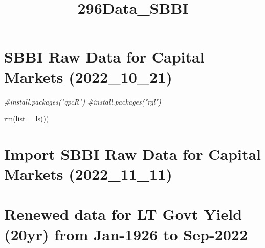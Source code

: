 \documentclass[
]{article}
\title{296Data\_SBBI}
\author{}
\date{\vspace{-2.5em}}
\newenvironment{Shaded}{\begin{snugshade}}{\end{snugshade}}
\newcommand{\AttributeTok}[1]{\textcolor[rgb]{0.77,0.63,0.00}{#1}}
\newcommand{\CommentTok}[1]{\textcolor[rgb]{0.56,0.35,0.01}{\textit{#1}}}
\newcommand{\FunctionTok}[1]{\textcolor[rgb]{0.00,0.00,0.00}{#1}}
\newcommand{\NormalTok}[1]{#1}
\begin{document}
\maketitle

\hypertarget{sbbi-raw-data-for-capital-markets-2022_10_21}{%
\section{SBBI Raw Data for Capital Markets
(2022\_10\_21)}\label{sbbi-raw-data-for-capital-markets-2022_10_21}}

\begin{Shaded}
\begin{Highlighting}[]
\CommentTok{\#install.packages("qpcR")}
\CommentTok{\#install.packages("rgl")}
\end{Highlighting}
\end{Shaded}

\begin{Shaded}
\begin{Highlighting}[]
\FunctionTok{rm}\NormalTok{(}\AttributeTok{list =} \FunctionTok{ls}\NormalTok{())}
\end{Highlighting}
\end{Shaded}

\hypertarget{import-sbbi-raw-data-for-capital-markets-2022_11_11}{%
\section{Import SBBI Raw Data for Capital Markets
(2022\_11\_11)}\label{import-sbbi-raw-data-for-capital-markets-2022_11_11}}

\hypertarget{renewed-data-for-lt-govt-yield-20yr-from-jan-1926-to-sep-2022}{%
\section{Renewed data for LT Govt Yield (20yr) from Jan-1926 to
Sep-2022}\label{renewed-data-for-lt-govt-yield-20yr-from-jan-1926-to-sep-2022}}
\end{document}
